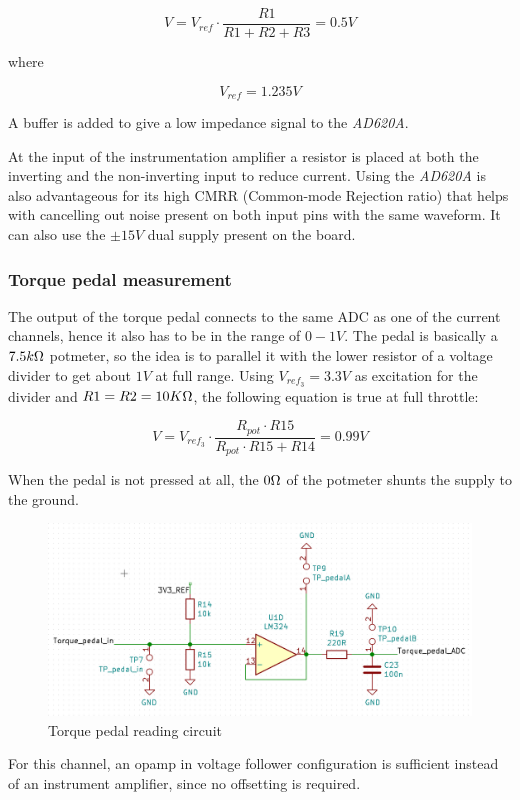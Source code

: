\begin{equation}
	V = V_{ref} \cdot \frac{R1}{R1+R2+R3} = 0.5V
\end{equation}

where 

\begin{equation}
V_{ref} = 1.235V
\end{equation}

A buffer is added to give a low impedance signal to the \textit{AD620A}.

At the input of the instrumentation amplifier a resistor is placed at both the inverting and the non-inverting input to reduce current. Using the \textit{AD620A} is also advantageous for its high CMRR (Common-mode Rejection ratio) that helps with cancelling out noise present on both input pins with the same waveform. It can also use the $\pm15V$ dual supply present on the board.

\subsubsection{Torque pedal measurement}
The output of the torque pedal connects to the same ADC as one of the current channels, hence it also has to be in the range of $0-1V$. The pedal is basically a $7.5k\ohm$ potmeter, so the idea is to parallel it with the lower resistor of a voltage divider to get about $1V$ at full range. Using $V_{ref_3} = 3.3V$ as excitation for the divider and $R1 = R2 = 10K\ohm$, the following equation is true at full throttle: 

\begin{equation}
	V = V_{ref_3} \cdot \frac{R_{pot} \cdot R15}{R_{pot} \cdot R15 + R14} = 0.99V
\end{equation}

When the pedal is not pressed at all, the $0\ohm$ of the potmeter shunts the supply to the ground.

\begin{figure}[H]
\centering
\includegraphics[width=1\linewidth]{pictures/hardware/Analog_Interface_board/torque_pedal_divider.png}
\caption{Torque pedal reading circuit}
\label{fig:torque_pedal_divider}
\end{figure}

For this channel, an opamp in voltage follower configuration is sufficient instead of an instrument amplifier, since no offsetting is required.